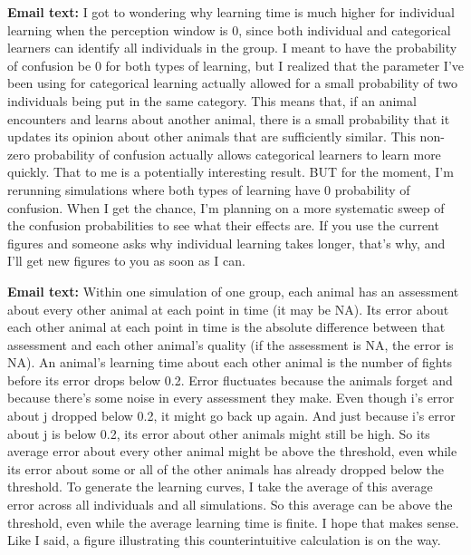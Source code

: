 \textbf{Email text: }I got to wondering why learning time is much higher for individual learning when the perception window is 0, since both individual and categorical learners can identify all individuals in the group. I meant to have the probability of confusion be 0 for both types of learning, but I realized that the parameter I've been using  for categorical learning actually allowed for a small probability of two individuals being put in the same category. This means that, if an animal encounters and learns about another animal, there is a small probability that it updates its opinion about other animals that are sufficiently similar. This non-zero probability of confusion actually allows categorical learners to learn more quickly. That to me is a potentially interesting result. BUT for the moment, I'm rerunning simulations where both types of learning have 0 probability of confusion. When I get the chance, I'm planning on a more systematic sweep of the confusion probabilities to see what their effects are. If you use the current figures and someone asks why individual learning takes longer, that's why, and I'll get new figures to you as soon as I can.

\textbf{Email text:} Within one simulation of one group, each animal has an assessment about every other animal at each point in time (it may be NA). Its error about each other animal at each point in time is the absolute difference between that assessment and each other animal's quality (if the assessment is NA, the error is NA). An animal's learning time about each other animal is the number of fights before its error drops below 0.2. Error fluctuates because the animals forget and because there's some noise in every assessment they make. Even though i's error about j dropped below 0.2, it might go back up again. And just because i's error about j is below 0.2, its error about other animals might still be high. So its average error about every other animal might be above the threshold, even while its error about some or all of the other animals has already dropped below the threshold. To generate the learning curves, I take the average of this average error across all individuals and all simulations. So this average can be above the threshold, even while the average learning time is finite. I hope that makes sense. Like I said, a figure illustrating this counterintuitive calculation is on the way. 

